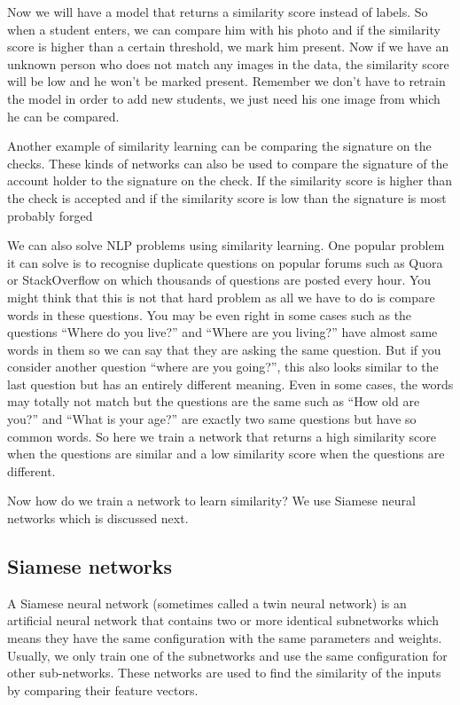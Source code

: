 Now we will have a model that returns a similarity score instead of labels. So when a student enters, we can compare him with his photo and if the similarity score is higher than a certain threshold, we mark him present. Now if we have an unknown person who does not match any images in the data, the similarity score will be low and he won’t be marked present. Remember we don’t have to retrain the model in order to add new students, we just need his one image from which he can be compared.

Another example of similarity learning can be comparing the signature on the checks. These kinds of networks can also be used to compare the signature of the account holder to the signature on the check. If the similarity score is higher than the check is accepted and if the similarity score is low than the signature is most probably forged

We can also solve NLP problems using similarity learning. One popular problem it can solve is to recognise duplicate questions on popular forums such as Quora or StackOverflow on which thousands of questions are posted every hour. You might think that this is not that hard problem as all we have to do is compare words in these questions. You may be even right in some cases such as the questions “Where do you live?” and “Where are you living?” have almost same words in them so we can say that they are asking the same question. But if you consider another question “where are you going?”, this also looks similar to the last question but has an entirely different meaning. Even in some cases, the words may totally not match but the questions are the same such as “How old are you?” and “What is your age?” are exactly two same questions but have so common words. So here we train a network that returns a high similarity score when the questions are similar and a low similarity score when the questions are different.

Now how do we train a network to learn similarity? We use Siamese neural networks which is discussed next.

\subsection{Siamese networks}

A Siamese neural network (sometimes called a twin neural network) is an artificial neural network that contains two or more identical subnetworks which means they have the same configuration with the same parameters and weights. Usually, we only train one of the subnetworks and use the same configuration for other sub-networks. These networks are used to find the similarity of the inputs by comparing their feature vectors.

